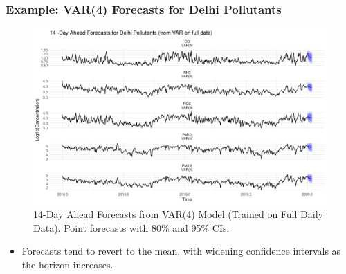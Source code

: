 \documentclass[svgnames, 12pt]{beamer}
\begin{document}
\begin{frame}
    \frametitle{Example: VAR(4) Forecasts for Delhi Pollutants}
    \begin{figure}
        \includegraphics[width=\linewidth]{../analysis/assets/var_forecast_delhi.png}
        \caption{14-Day Ahead Forecasts from VAR(4) Model (Trained on Full Daily Data). Point forecasts with 80\% and 95\% CIs.}
    \end{figure}
    \begin{itemize}
        \item \footnotesize Forecasts tend to revert to the mean, with widening confidence intervals as the horizon increases.
    \end{itemize}
\end{frame}

\end{document}

